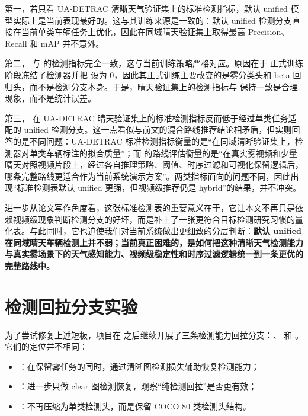 第一，若只看 UA-DETRAC 清晰天气验证集上的标准检测指标，默认 unified 模型实际上是当前表现最好的。这与其训练来源是一致的：默认 unified 检测分支直接在当前单类车辆任务上优化，因此在同域晴天验证集上取得最高 Precision、Recall 和 mAP 并不意外。

第二， 与  的检测指标完全一致，这与当前训练策略严格对应。原因在于  正式训练阶段冻结了检测器并把  设为 0，因此其正式训练主要改变的是雾分类头和 beta 回归头，而不是检测分支本身。于是，晴天验证集上的检测指标与  保持一致是合理现象，而不是统计误差。

第三， 在 UA-DETRAC 晴天验证集上的标准检测指标反而低于经过单类任务适配的 unified 检测分支。这一点看似与前文的混合路线推荐结论相矛盾，但实则回答的是不同问题：UA-DETRAC 标准检测指标衡量的是“在同域清晰验证集上，检测器对单类车辆标注的拟合质量”；而  的路线评估衡量的是“在真实雾视频和少量晴天对照视频片段上，经过各自推理策略、阈值、时序过滤和可视化保留逻辑后，哪条完整路线更适合作为当前系统演示方案”。两类指标面向的问题不同，因此出现“标准检测表默认 unified 更强，但视频级推荐仍是 hybrid”的结果，并不冲突。

进一步从论文写作角度看，这张标准检测表的重要意义在于，它让本文不再只是依赖视频级现象判断检测分支的好坏，而是补上了一张更符合目标检测研究习惯的量化表。与此同时，它也迫使我们对当前系统做出更细致的分层判断：\textbf{默认 unified 在同域晴天车辆检测上并不弱；当前真正困难的，是如何把这种清晰天气检测能力与真实雾场景下的天气感知能力、视频级稳定性和时序过滤逻辑统一到一条更优的完整路线中。}

\section{检测回拉分支实验}

为了尝试修复上述短板，项目在  之后继续开展了三条检测能力回拉分支：、 和 。它们的定位并不相同：

\begin{itemize}[leftmargin=2em]
\item {}：在保留雾任务的同时，通过清晰图检测损失辅助恢复检测能力；
\item {}：进一步只做 clear 图检测恢复，观察“纯检测回拉”是否更有效；
\item {}：不再压缩为单类检测头，而是保留 COCO 80 类检测头结构。
\end{itemize}


